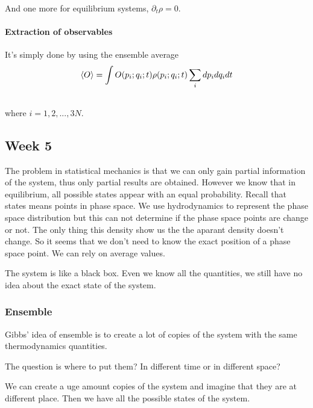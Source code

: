 \documentclass[letterpaper,10pt,english]{sphinxmanual}
\newcommand{\avg}[1]{\left< #1 \right>}
\begin{document}
And one more for equilibrium systems, $\partial_t \rho =0$.


\paragraph{Extraction of observables}
\label{equilibrium/week4:extraction-of-observables}
It's simply done by using the ensemble average
\begin{gather}
\begin{split}\avg{O} = \int O(p_i; q_i;t) \rho(p_i;q_i;t) \sum_i dp_i dq_i dt\end{split}\notag\\\begin{split}\end{split}\notag
\end{gather}
where $i=1,2,..., 3N$.


\subsection{Week 5}
\label{equilibrium/week5:week-5}\label{equilibrium/week5::doc}
The problem in statistical mechanics is that we can only gain partial information of the system, thus only partial results are obtained. However we know that in equilibrium, all possible states appear with an equal probability. Recall that states means points in phase space. We use hydrodynamics to represent the phase space distribution but this can not determine if the phase space points are change or not. The only thing this density show us the the aparant density doesn't change. So it seems that we don't need to know the exact position of a phase space point. We can rely on average values.

The system is like a black box. Even we know all the quantities, we still have no idea about the exact state of the system.


\subsubsection{Ensemble}
\label{equilibrium/week5:index-0}\label{equilibrium/week5:ensemble}
Gibbs' idea of ensemble is to create a lot of copies of the system with the same thermodynamics quantities.

The question is where to put them? In different time or in different space?

We can create a uge amount copies of the system and imagine that they are at different place. Then we have all the possible states of the system.
\end{document}
